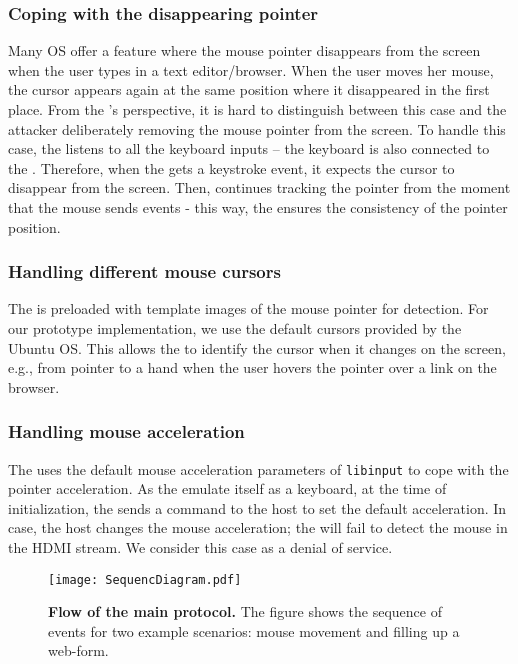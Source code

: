 \subsubsection{\bfseries Coping with the disappearing pointer} Many OS offer a feature where the mouse pointer disappears from the screen when the user types in a text editor/browser. When the user moves her mouse, the cursor appears again at the same position where it disappeared in the first place. From the \device's perspective, it is hard to distinguish between this case and the attacker deliberately removing the mouse pointer from the screen. To handle this case, the \device listens to all the keyboard inputs -- the keyboard is also connected to the \device. Therefore, when the \device gets a keystroke event, it expects the cursor to disappear from the screen. Then, \device continues tracking the pointer from the moment that the mouse sends events  - this way, the \device ensures the consistency of the pointer position.  


\subsubsection{\bfseries Handling different mouse cursors} The \device is preloaded with template images of the mouse pointer for detection. For our \name prototype implementation, we use the default cursors provided by the Ubuntu OS. This allows the \device to identify the cursor when it changes on the screen, e.g., from pointer to a hand when the user hovers the pointer over a link on the browser. 

 
\subsubsection{\bfseries Handling mouse acceleration} The \device uses the default mouse acceleration parameters of \texttt{libinput} to cope with the pointer acceleration. As the \device emulate itself as a keyboard, at the time of initialization, the \device sends a command to the host to set the default acceleration. In case, the host changes the mouse acceleration; the \device will fail to detect the mouse in the HDMI stream. We consider this case as a denial of service.

\begin{figure}[t]
\centering
\texttt{[image: SequencDiagram.pdf]}
\caption{\textbf{Flow of the \name main protocol.} The figure shows the sequence of events for two example scenarios: mouse movement and filling up a web-form.}
\spacesave
\label{fig:sequence}
\centering
\end{figure}


